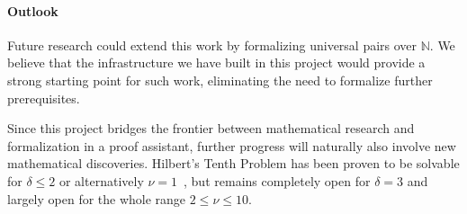 \documentclass[a4paper,USenglish,cleveref,autoref,thm-restate]{lipics-v2021}
\newcommand{\N}{{\mathbb N}}
\begin{document}
\paragraph*{Outlook}
Future research could extend this work by formalizing universal pairs over $\N$. We believe that the infrastructure we have built in this project would provide a strong starting point for such work, eliminating the need to formalize further prerequisites. 

Since this project bridges the frontier between mathematical research and formalization in a proof assistant, further progress will naturally also involve new mathematical discoveries. Hilbert's Tenth Problem has been proven to be solvable for $\delta \leq 2$ or alternatively $\nu = 1$~\cite{9var}, but remains completely open for $\delta = 3$ and largely open for the whole range $2 \leq \nu \leq 10$.



\end{document}
